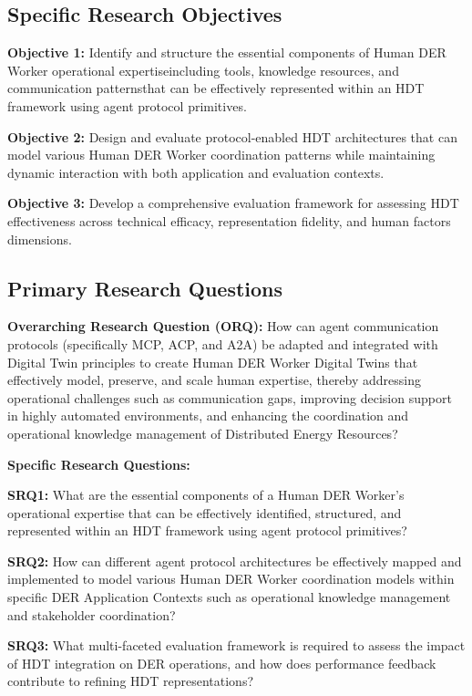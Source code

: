 \documentclass[12pt,a4paper]{article}
\newcommand{\emdash}{\textemdash}
\begin{document}
\subsection{Specific Research Objectives}

\textbf{Objective 1:} Identify and structure the essential components of Human DER Worker operational expertise\emdash{}including tools, knowledge resources, and communication patterns\emdash{}that can be effectively represented within an HDT framework using agent protocol primitives.

\textbf{Objective 2:} Design and evaluate protocol-enabled HDT architectures that can model various Human DER Worker coordination patterns while maintaining dynamic interaction with both application and evaluation contexts.

\textbf{Objective 3:} Develop a comprehensive evaluation framework for assessing HDT effectiveness across technical efficacy, representation fidelity, and human factors dimensions.

\subsection{Primary Research Questions}

\textbf{Overarching Research Question (ORQ):} How can agent communication protocols (specifically MCP, ACP, and A2A) be adapted and integrated with Digital Twin principles to create Human DER Worker Digital Twins that effectively model, preserve, and scale human expertise, thereby addressing operational challenges such as communication gaps, improving decision support in highly automated environments, and enhancing the coordination and operational knowledge management of Distributed Energy Resources?

\textbf{Specific Research Questions:}

\textbf{SRQ1:} What are the essential components of a Human DER Worker's operational expertise that can be effectively identified, structured, and represented within an HDT framework using agent protocol primitives?

\textbf{SRQ2:} How can different agent protocol architectures be effectively mapped and implemented to model various Human DER Worker coordination models within specific DER Application Contexts such as operational knowledge management and stakeholder coordination?

\textbf{SRQ3:} What multi-faceted evaluation framework is required to assess the impact of HDT integration on DER operations, and how does performance feedback contribute to refining HDT representations?
\end{document}
